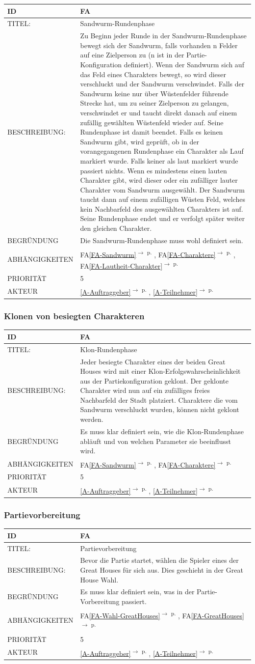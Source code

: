 \documentclass{uulm-assignment}
\newcounter{fa}
\newcommand{\fa}[7]{
\refstepcounter{fa}\label{#7}
\begin{tabularx}{16cm}{l|X}
\textbf{ID} & \textbf{FA\arabic{fa}} \\
\hline
TITEL: & #1 \\
\hline
BESCHREIBUNG: & #2 \\
\hline
BEGRÜNDUNG & #3 \\ 
\hline
ABHÄNGIGKEITEN & #4\\ 
\hline 
PRIORITÄT & #5\\ 
\hline 
AKTEUR & #6
\end{tabularx}
}
\newcommand{\rref}[1]{\ref{#1}\textsuperscript{$\rightarrow$ p. \pageref{#1}}}
\newcommand{\faref}[1]{FA\ref{#1}\textsuperscript{$\rightarrow$ p. \pageref{#1}}}
\begin{document}
\fa{Sandwurm-Rundenphase}{ Zu Beginn jeder Runde in der Sandwurm-Rundenphase bewegt sich der Sandwurm, falls vorhanden n Felder auf eine Zielperson zu (n ist in der Partie-Konfiguration definiert). Wenn der Sandwurm sich auf das Feld eines Charakters bewegt, so wird dieser verschluckt und der Sandwurm verschwindet. Falls der Sandwurm keine nur über Wüstenfelder führende Strecke hat, um zu seiner Zielperson zu gelangen, verschwindet er und taucht direkt danach auf einem zufällig gewählten Wüstenfeld wieder auf. Seine Rundenphase ist damit beendet. Falls es keinen Sandwurm gibt, wird geprüft, ob in der vorangegangenen Rundenphase ein Charakter als Lauf markiert wurde. Falls keiner als laut markiert wurde passiert nichts. Wenn es mindestens einen lauten Charakter gibt, wird dieser oder ein zufälliger lauter Charakter vom Sandwurm ausgewählt. Der Sandwurm taucht dann auf einem zufälligen Wüsten Feld, welches kein Nachbarfeld des ausgewählten Charakters ist auf. Seine Rundenphase endet und er verfolgt später weiter den gleichen Charakter.}{Die Sandwurm-Rundenphase muss wohl definiert sein.}{\faref{FA-Sandwurm}, \faref{FA-Charaktere}, \faref{FA-Lautheit-Charakter}}{5}{\rref{A-Auftraggeber}, \rref{A-Teilnehmer}}{FA-Phase-Sandwurm}

\subsubsection{Klonen von besiegten Charakteren}

\fa{Klon-Rundenphase}{Jeder besiegte Charakter eines der beiden Great Houses wird mit einer Klon-Erfolgswahrscheinlichkeit aus der Partiekonfiguration geklont. Der geklonte Charakter wird nun auf ein zufälliges freies Nachbarfeld der Stadt platziert. Charaktere die vom Sandwurm verschluckt wurden, können nicht geklont werden.}{Es muss klar definiert sein, wie die Klon-Rundenphase abläuft und von welchen Parameter sie beeinflusst wird.}{\faref{FA-Sandwurm}, \faref{FA-Charaktere}}{5}{\rref{A-Auftraggeber}, \rref{A-Teilnehmer}}{FA-Phase-Klon}

\subsubsection{Partievorbereitung}

\fa{Partievorbereitung}{Bevor die Partie startet, wählen die Spieler eines der Great Houses für sich aus. Dies geschieht in der Great House Wahl.}{Es muss klar definiert sein, was in der Partie-Vorbereitung passiert. }{\faref{FA-Wahl-GreatHouses}, \faref{FA-GreatHouses}}{5}{\rref{A-Auftraggeber}, \rref{A-Teilnehmer}}{FA-Partievorbereitung}
\end{document}
